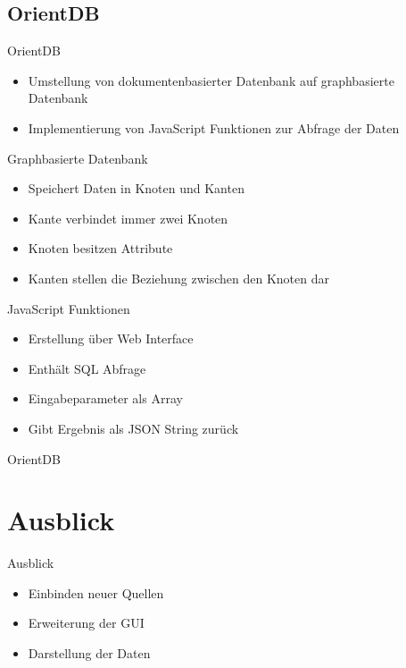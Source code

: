 \documentclass[aspectratio=169]{beamer}
\begin{document}
\subsection{OrientDB}

\begin{frame}{OrientDB}
  \begin{itemize}
  	\item Umstellung von dokumentenbasierter Datenbank auf graphbasierte Datenbank
  	\item Implementierung von JavaScript Funktionen zur Abfrage der Daten
  \end{itemize}
\end{frame}

\begin{frame}{Graphbasierte Datenbank}
  \begin{itemize}
  	\item Speichert Daten in Knoten und Kanten
  	\item Kante verbindet immer zwei Knoten
  	\item Knoten besitzen Attribute
  	\item Kanten stellen die Beziehung zwischen den Knoten dar
  \end{itemize}
\end{frame}

\begin{frame}{JavaScript Funktionen}
  \begin{itemize}
  	\item Erstellung über Web Interface
  	\item Enthält SQL Abfrage
  	\item Eingabeparameter als Array
  	\item Gibt Ergebnis als JSON String zurück
  \end{itemize}
\end{frame}

\begin{frame}{OrientDB}
\end{frame}

\section{Ausblick}

\begin{frame}{Ausblick}
  \begin{itemize}
  	\item Einbinden neuer Quellen
  	\item Erweiterung der GUI
  	\item Darstellung der Daten
  \end{itemize}
\end{frame}

\begin{frame}{}
\end{frame}
\end{document}
